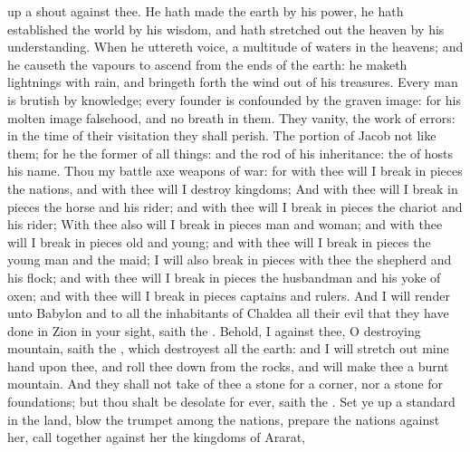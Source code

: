 {up a
shout against thee.
He hath
made the
earth by his
power, he hath
established the
world by his
wisdom, and hath stretched
out the
heaven by his
understanding.
When he
uttereth
{}
voice,
{} a
multitude of
waters in the
heavens; and he causeth the
vapours to
ascend from the
ends of the
earth: he
maketh
lightnings with
rain, and bringeth
forth the
wind out of his
treasures.
Every
man is
brutish by
{}
knowledge; every
founder is
confounded by the graven
image: for his molten
image
{}
falsehood, and
{} no
breath in them.
They
{}
vanity, the
work of
errors: in the
time of their
visitation they shall
perish.
The
portion of
Jacob
{} not like them; for he
{} the
former of all things: and
{} the
rod of his
inheritance: the
{} of
hosts
{} his
name.
Thou
{} my battle
axe
{}
weapons of
war: for with thee will I break in
pieces the
nations, and with thee will I
destroy
kingdoms;
And with thee will I break in
pieces the
horse and his
rider; and with thee will I break in
pieces the
chariot and his
rider;
With thee also will I break in
pieces
man and
woman; and with thee will I break in
pieces
old and
young; and with thee will I break in
pieces the young
man and the
maid;
I will also break in
pieces with thee the
shepherd and his
flock; and with thee will I break in
pieces the
husbandman and his yoke of
oxen; and with thee will I break in
pieces
captains and
rulers.
And I will
render unto
Babylon and to all the
inhabitants of
Chaldea all their
evil that they have
done in
Zion in your
sight,
saith the
{}.
Behold, I
{} against thee, O
destroying
mountain,
saith the
{}, which
destroyest all the
earth: and I will stretch
out mine
hand upon thee, and roll thee
down from the
rocks, and will
make thee a
burnt
mountain.
And they shall not
take of thee a
stone for a
corner, nor a
stone for
foundations; but thou shalt be
desolate for
ever,
saith the
{}.
Set ye
up a
standard in the
land,
blow the
trumpet among the
nations,
prepare the
nations against her, call
together against her the
kingdoms of
Ararat,
}
